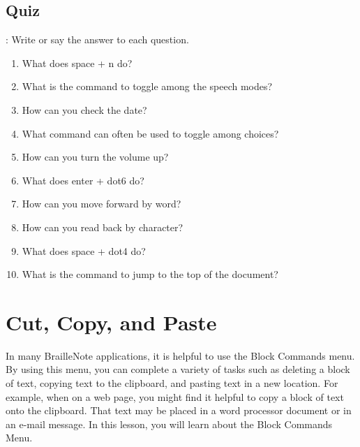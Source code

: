 \documentclass[10pt,letterpaper,twoside]{report}
\begin{document}
{\subsection{Quiz}:
Write or say the answer to each question.
\begin{enumerate}
	\item What does space + n do?
	\item What is the command to toggle among the speech modes?
	\item How can you check the date?
	\item What command can often be used to toggle among choices?
	\item How can you turn the volume up?
	\item What does enter + dot6 do?
	\item How can you move forward by word?
	\item How can you read back by character?
	\item What does space + dot4 do?
	\item What is the command to jump to the top of the document?
\end{enumerate}

\clearpage 
\section{Cut, Copy, and Paste}
In many BrailleNote applications, it is helpful to use the Block Commands menu. By using this menu, you can complete a variety of tasks such as deleting a block of text, copying text to the clipboard, and pasting text in a new location. For example, when on a web page, you might find it helpful to copy a block of text onto the clipboard. That text may be placed in a word processor document or in an e-mail message. In this lesson, you will learn about the Block Commands Menu.
}
\end{document}
